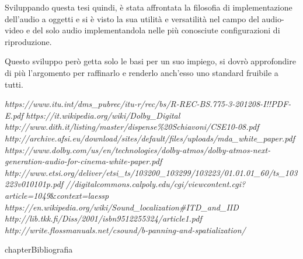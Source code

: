 \documentclass[12pt,a4paper]{report}
\begin{document}
Sviluppando questa tesi quindi, è stata affrontata la filosofia di implementazione dell'audio a oggetti e si è visto la sua utilità e versatilità nel campo del audio-video e del solo audio implementandola nelle più conosciute configurazioni di riproduzione.

Questo sviluppo però getta solo le basi per un suo impiego, si dovrò approfondire di più l'argomento per raffinarlo e renderlo anch'esso uno standard fruibile a tutti.





\begin{thebibliography}{}

 \textit{https://www.itu.int/dms\_pubrec/itu-r/rec/bs/R-REC-BS.775-3-201208-I!!PDF-E.pdf}
 \textit{https://it.wikipedia.org/wiki/Dolby\_Digital}
 \textit{http://www.dith.it/listing/master/dispense\%20Schiavoni/CSE10-08.pdf}
 \textit{http://archive.afsi.eu/download/sites/default/files/uploads/mda\_white\_paper.pdf}
 \textit{https://www.dolby.com/us/en/technologies/dolby-atmos/dolby-atmos-next-generation-audio-for-cinema-white-paper.pdf}
\textit{http://www.etsi.org/deliver/etsi\_ts/103200\_103299/103223/01.01.01\_60/ts\_103223v010101p.pdf}
\textit{//digitalcommons.calpoly.edu/cgi/viewcontent.cgi?article=1049}\&\textit{context=laessp}
 \textit{https://en.wikipedia.org/wiki/Sound\_localization\#ITD\_and\_IID}
 \textit{http://lib.tkk.fi/Diss/2001/isbn9512255324/article1.pdf}
 \textit{http://write.flossmanuals.net/csound/b-panning-and-spatialization/}
\end{thebibliography}

 {chapter}{Bibliografia}
\end{document}
